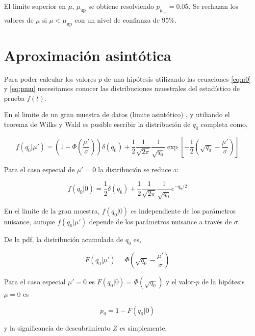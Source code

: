El limite superior {\cls} en $\mu$, $\mu_\text{up}$ se obtiene resolviendo $p_{\mu_\text{up}} = 0.05$.
Se rechazan los valores de $\mu$ si $\mu  < \mu_\text{up}$ con un nivel de confianza de 95\%.


\section{Aproximación asintótica}

Para poder calcular los valores $p$ de una hipótesis utilizando las ecuaciones
\eqref{eq:p0} y \eqref{eq:pmu} necesitamos conocer las distribuciones muestrales del
estadístico de prueba $f(t)$.

En el limite de un gran muestra de datos (limite asintótico) \cite{AsymAprox}, y utiliando el teorema
de Wilks\cite{WilksTheo} y Wald\cite{WaldTheo} es posible escribir la distribución
de $q_0$ completa como,

\begin{equation}
  f(q_0|\mu') = \left( 1 - \Phi\left(\frac{\mu'}{\sigma}\right)\right) \delta(q_0) +
  \frac{1}{2}\frac{1}{\sqrt{2\pi}}\frac{1}{\sqrt{q_0}} \exp \left[ -\frac{1}{2} \left( \sqrt{q_0} - \frac{\mu'}{\sigma} \right)\right]
\end{equation}

Para el caso especial de $\mu' = 0$ la distribución se reduce a:

\begin{equation}
  f(q_0|0) = \frac{1}{2} \delta(q_0) + \frac{1}{2}\frac{1}{\sqrt{2\pi}}\frac{1}{\sqrt{q_0}} e^{-q_0/2}
\end{equation}

En el limite de la gran muestra, $f(q_0|0)$ es independiente de los parámetros nuisance,
aunque $f(q_0|\mu')$ depende de los parámetros nuisance a través de $\sigma$.

De la pdf, la distribución acumulada de $q_0$ es,

\begin{equation}
  F(q_0|\mu') = \Phi \left( \sqrt{q_0} - \frac{\mu'}{\sigma} \right)
\end{equation}

Para el caso especial $\mu' = 0$ es $F(q_0|0) = \Phi(\sqrt{q_0})$ y el valor-$p$
de la hipótesis $\mu=0$ es

\begin{equation}
  p_0 = 1 - F(q_0|0)
\end{equation}

y la significancia de descubrimiento $Z$ es simplemente,

